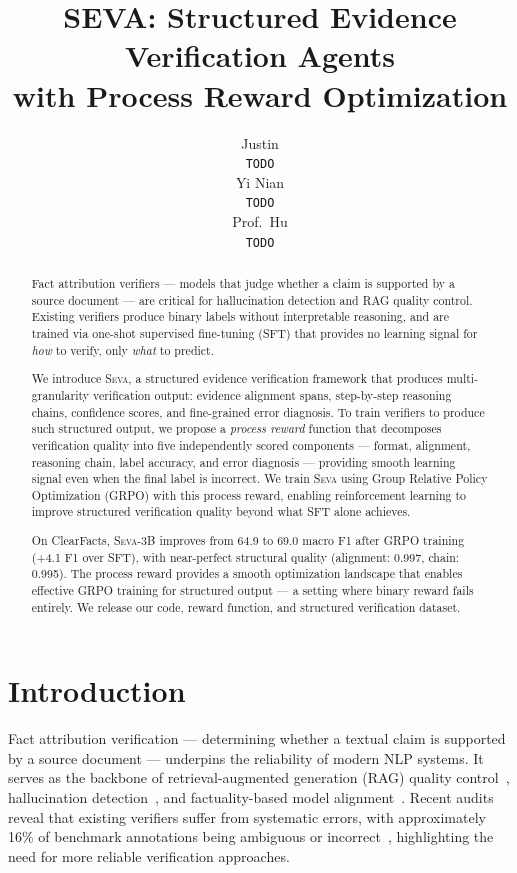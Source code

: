 \documentclass{article}
\title{SEVA: Structured Evidence Verification Agents \\with Process Reward Optimization}
\author{
  Justin \\
  \texttt{TODO} \\
  \And
  Yi Nian \\
  \texttt{TODO} \\
  \And
  Prof.\ Hu \\
  \texttt{TODO}
}
\newcommand{\seva}{\textsc{Seva}}
\begin{document}
\maketitle

\begin{abstract}
Fact attribution verifiers --- models that judge whether a claim is supported by a source document --- are critical for hallucination detection and RAG quality control.
Existing verifiers produce binary labels without interpretable reasoning, and are trained via one-shot supervised fine-tuning (SFT) that provides no learning signal for \emph{how} to verify, only \emph{what} to predict.

We introduce \seva{}, a structured evidence verification framework that produces multi-granularity verification output: evidence alignment spans, step-by-step reasoning chains, confidence scores, and fine-grained error diagnosis.
To train verifiers to produce such structured output, we propose a \emph{process reward} function that decomposes verification quality into five independently scored components --- format, alignment, reasoning chain, label accuracy, and error diagnosis --- providing smooth learning signal even when the final label is incorrect.
We train \seva{} using Group Relative Policy Optimization (GRPO) with this process reward, enabling reinforcement learning to improve structured verification quality beyond what SFT alone achieves.

On ClearFacts, \seva{}-3B improves from 64.9 to 69.0 macro F1 after GRPO training (+4.1 F1 over SFT), with near-perfect structural quality (alignment: 0.997, chain: 0.995).
The process reward provides a smooth optimization landscape that enables effective GRPO training for structured output --- a setting where binary reward fails entirely.
We release our code, reward function, and structured verification dataset.
\end{abstract}

\section{Introduction}
\label{sec:intro}

Fact attribution verification --- determining whether a textual claim is supported by a source document --- underpins the reliability of modern NLP systems.
It serves as the backbone of retrieval-augmented generation (RAG) quality control~\citep{gao2023rarr}, hallucination detection~\citep{min2023factscore}, and factuality-based model alignment~\citep{tian2024finetuning}.
Recent audits reveal that existing verifiers suffer from systematic errors, with approximately 16\% of benchmark annotations being ambiguous or incorrect~\citep{seo2025vtv}, highlighting the need for more reliable verification approaches.
\end{document}
